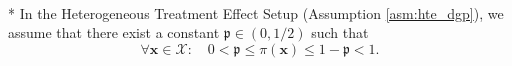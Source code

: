 \begin{boxD}
	\begin{asm}\label{asm:treatment_overlap}\mbox{}\\*
		In the Heterogeneous Treatment Effect Setup (Assumption \ref{asm:hte_dgp}), we assume that there exist a constant $\mathfrak{p} \in (0, 1/2)$ such that
		\begin{equation}
			\forall \mathbf{x} \in \mathcal{X}: \quad 
			0 < \mathfrak{p} \leq \pi\left(\mathbf{x}\right) \leq 1 - \mathfrak{p} < 1.
		\end{equation}
	\end{asm}
\end{boxD}